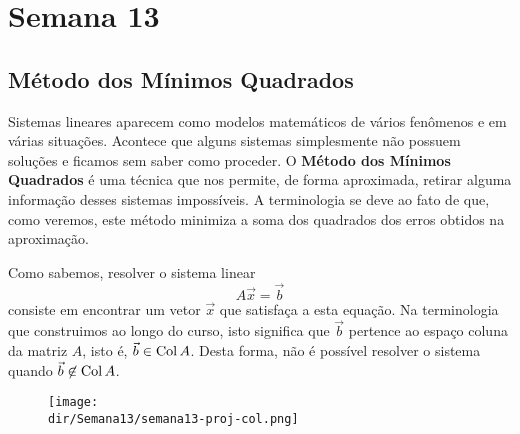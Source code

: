 \documentclass[../livro.tex]{subfiles}  %
\providecommand{\dir}{..}
\begin{document}


\chapter{Semana 13}


\section{Método dos Mínimos Quadrados}

Sistemas lineares aparecem como modelos matemáticos de vários fenômenos e em várias situações. Acontece que alguns sistemas simplesmente não possuem soluções e ficamos sem saber como proceder. O \textbf{Método dos Mínimos Quadrados} é uma técnica que nos permite, de forma aproximada, retirar alguma informação desses sistemas impossíveis. A terminologia se deve ao fato de que, como veremos, este método minimiza a soma dos quadrados dos erros obtidos na aproximação.

Como sabemos, resolver o sistema linear
\[
A \vec{x} = \vec{b}
\] consiste em encontrar um vetor $\vec{x}$ que satisfaça a esta equação. Na terminologia que construimos ao longo do curso, isto significa que $\vec{b}$ pertence ao espaço coluna da matriz $A$, isto é, $\vec{b} \in \operatorname{Col} A$. Desta forma, não é possível resolver o sistema quando $\vec{b} \not\in \operatorname{Col} A$. 
\begin{figure}[h!]
  \begin{center}
    \texttt{[image: \\dir/Semana13/semana13-proj-col.png]}
  \end{center}
\end{figure}
\end{document}
